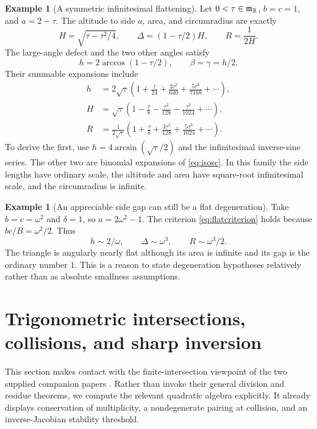 \documentclass[11pt,letterpaper]{article}
\theoremstyle{definition}
\newtheorem{example}[theorem]{Example}
\theoremstyle{remark}
\newcommand{\R}{\mathbb R}\newcommand{\C}{\mathbb C}
\numberwithin{equation}{section}
\begin{document}
\begin{example}[A symmetric infinitesimal flattening]\label{ex:flat}
Let $0<\tau\in\mm_{\R}$, $b=c=1$, and $a=2-\tau$. The altitude to side $a$, area, and circumradius are exactly
\begin{equation}\label{eq:isosc}
 H=\sqrt{\tau-\tau^2/4},\qquad
 \Delta=(1-\tau/2)H,\qquad R=\frac1{2H}.
\end{equation}
The large-angle defect and the two other angles satisfy
\[
 h=2\arccos(1-\tau/2),\qquad \beta=\gamma=h/2.
\]
Their summable expansions include
\begin{align}\label{eq:isoexp}
 h&=2\sqrt\tau\left(1+\frac\tau{24}+\frac{3\tau^2}{640}
                         +\frac{5\tau^3}{7168}+\cdots\right),\\
 H&=\sqrt\tau\left(1-\frac\tau8-\frac{\tau^2}{128}
                         -\frac{\tau^3}{1024}+\cdots\right),\nonumber\\
 R&=\frac1{2\sqrt\tau}\left(1+\frac\tau8+\frac{3\tau^2}{128}
                         +\frac{5\tau^3}{1024}+\cdots\right).\nonumber
\end{align}
To derive the first, use $h=4\arcsin(\sqrt\tau/2)$ and the infinitesimal inverse-sine series. The other two are binomial expansions of \eqref{eq:isosc}. In this family the side lengths have ordinary scale, the altitude and area have square-root infinitesimal scale, and the circumradius is infinite.
\end{example}

\begin{example}[An appreciable side gap can still be a flat degeneration]
Take $b=c=\omega^2$ and $\delta=1$, so $a=2\omega^2-1$. The criterion \eqref{eq:flatcriterion} holds because $bc/B=\omega^2/2$. Thus
\[
 h\sim2/\omega,\qquad \Delta\sim\omega^3,\qquad R\sim\omega^3/2.
\]
The triangle is angularly nearly flat although its area is infinite and its gap is the ordinary number $1$. This is a reason to state degeneration hypotheses relatively rather than as absolute smallness assumptions.
\end{example}

\section{Trigonometric intersections, collisions, and sharp inversion}\label{sec:collisions}
This section makes contact with the finite-intersection viewpoint of the two supplied companion papers \cite{InputGeometry,InputIntersections}. Rather than invoke their general division and residue theorems, we compute the relevant quadratic algebra explicitly. It already displays conservation of multiplicity, a nondegenerate pairing at collision, and an inverse-Jacobian stability threshold.
\end{document}
